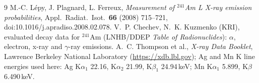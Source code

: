\documentclass[11pt,a4paper]{article}
\begin{document}
\begin{thebibliography}{9}
 M.-C. L\'epy, J. Plagnard, L. Ferreux, \emph{Measurement of $^{241}$Am L X-ray emission
probabilities}, Appl.\ Radiat.\ Isot.\ \textbf{66} (2008) 715--721, doi:10.1016/j.apradiso.2008.02.078.
 V.~P. Chechev, N.~K. Kuzmenko (KRI), evaluated decay data for $^{241}$Am (LNHB/DDEP
\emph{Table of Radionuclides}): $\alpha$, electron, x-ray and $\gamma$-ray emissions.
 A.~C. Thompson et al., \emph{X-ray Data Booklet}, Lawrence Berkeley National Laboratory
(\url{https://xdb.lbl.gov}); Ag and Mn K line energies used here: Ag K$\alpha_1$ 22.16, K$\alpha_2$ 21.99,
K$\beta_1$ 24.94\,keV; Mn K$\alpha_1$ 5.899, K$\beta$ 6.490\,keV.
\end{thebibliography}
\end{document}
